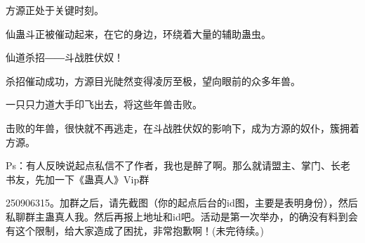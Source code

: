 \begin{this_body}
方源正处于关键时刻。

仙蛊斗正被催动起来，在它的身边，环绕着大量的辅助蛊虫。

仙道杀招――斗战胜伏奴！

杀招催动成功，方源目光陡然变得凌厉至极，望向眼前的众多年兽。

一只只力道大手印飞出去，将这些年兽击败。

击败的年兽，很快就不再逃走，在斗战胜伏奴的影响下，成为方源的奴仆，簇拥着方源。

Ps：有人反映说起点私信不了作者，我也是醉了啊。那么就请盟主、掌门、长老书友，先加一下《蛊真人》Vip群

250906315。加群之后，请先截图（你的起点后台的id图，主要是表明身份），然后私聊群主蛊真人我。然后再报上地址和id吧。活动是第一次举办，的确没有料到会有这个限制，给大家造成了困扰，非常抱歉啊！(未完待续。)

\end{this_body}

